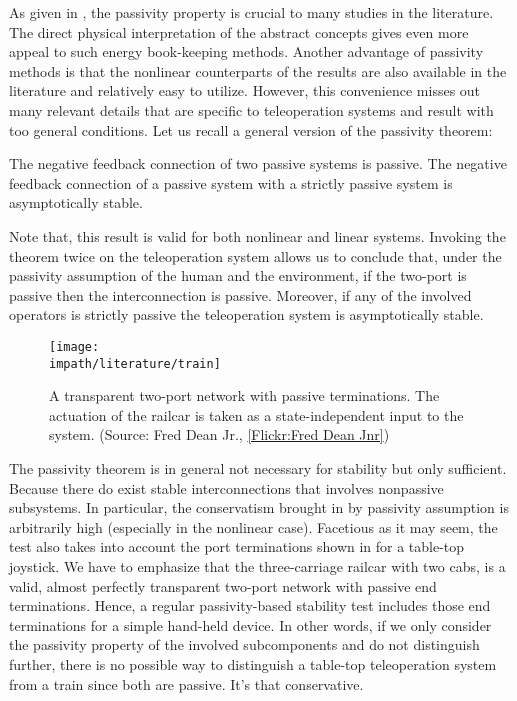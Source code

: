 As given in , the passivity property is crucial to many studies in the literature. The direct 
physical interpretation of the abstract concepts gives even more appeal to such energy book-keeping methods. Another 
advantage of passivity methods is that the nonlinear counterparts of the results are also available in the literature 
and relatively easy to utilize. However, this convenience misses out many relevant details that are specific to 
teleoperation systems and result with too general conditions. Let us recall a general version of the passivity theorem:

\begin{thm} The negative feedback connection of two passive systems is passive. The negative feedback connection of a passive system with
a strictly passive system is asymptotically stable.\end{thm}

Note that, this result is valid for both nonlinear and linear systems. Invoking the theorem twice on the teleoperation 
system allows us to conclude that, under the passivity assumption of the human and the environment, if the two-port is 
passive then the interconnection is passive. Moreover, if any of the involved operators is strictly passive the teleoperation 
system is asymptotically stable. 

\begin{figure}%
\centering
\texttt{[image: \\impath/literature/train]}%
\caption[A transparent two-port network with passive terminations]{A transparent two-port network with passive 
terminations. The actuation of the railcar is taken as a state-independent input to the system. (Source: Fred Dean Jr., 
\href{http://www.flickr.com/photos/be216cd1/5971825854/}{[Flickr:Fred Dean Jnr]})}%
\label{fig:lit:train}%
\end{figure}


The passivity theorem is in general not necessary for stability but only sufficient. Because there do exist stable 
interconnections that involves nonpassive subsystems. In particular, the conservatism brought in by passivity 
assumption is arbitrarily high (especially in the nonlinear case). Facetious as it may seem, the test also takes 
into account the port terminations shown in  for a table-top joystick. We have to emphasize 
that the three-carriage railcar with two cabs, is a valid, almost perfectly transparent two-port network with 
passive end terminations. Hence, a regular passivity-based stability test includes those end terminations for 
a simple hand-held device. In other words, if we only consider the passivity property of the involved subcomponents and do not 
distinguish further, there is no possible way to distinguish a table-top teleoperation system from a train since
both are passive. It's that conservative.


